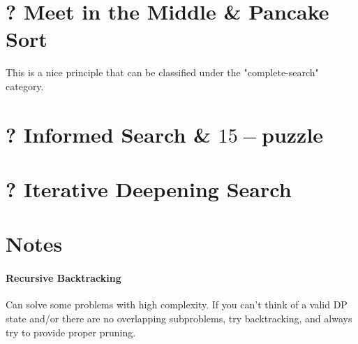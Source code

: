 \documentclass[12pt]{book}
\begin{document}
\section{? Meet in the Middle \& Pancake Sort}
This is a nice principle that can be classified under the "complete-search" category.
\section{? Informed Search \& $15-$puzzle}
\section{? Iterative Deepening Search}
\section{Notes}
\paragraph{Recursive Backtracking}
Can solve some problems with high complexity. If you can't think of a valid DP state and/or there are no overlapping subproblems, try backtracking, and always try to provide proper pruning.
\end{document}
